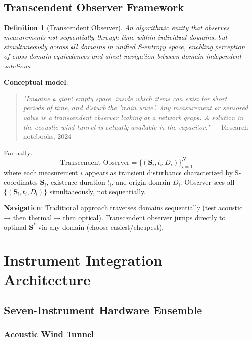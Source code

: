 \documentclass[12pt,a4paper]{article}
\newtheorem{definition}{Definition}
\begin{document}
\subsection{Transcendent Observer Framework}

\begin{definition}[Transcendent Observer]
An algorithmic entity that observes measurements not sequentially through time within individual domains, but simultaneously across all domains in unified S-entropy space, enabling perception of cross-domain equivalences and direct navigation between domain-independent solutions \cite{sachikonye2024transplanckian}.
\end{definition}

\textbf{Conceptual model}:
\begin{quote}
\textit{"Imagine a giant empty space, inside which items can exist for short periods of time, and disturb the 'main wave'. Any measurement or sensored value is a transcendent observer looking at a network graph. A solution in the acoustic wind tunnel is actually available in the capacitor."} — Research notebooks, 2024
\end{quote}

Formally:
\begin{equation}
\text{Transcendent Observer} = \{(\mathbf{S}_i, t_i, D_i)\}_{i=1}^{N}
\end{equation}
where each measurement $i$ appears as transient disturbance characterized by S-coordinates $\mathbf{S}_i$, existence duration $t_i$, and origin domain $D_i$. Observer sees all $\{(\mathbf{S}_i, t_i, D_i)\}$ simultaneously, not sequentially.

\textbf{Navigation}: Traditional approach traverses domains sequentially (test acoustic → then thermal → then optical). Transcendent observer jumps directly to optimal $\mathbf{S}^*$ via any domain (choose easiest/cheapest).

\section{Instrument Integration Architecture}

\subsection{Seven-Instrument Hardware Ensemble}

\subsubsection{Acoustic Wind Tunnel \cite{sachikonye2024acoustic_wind_tunnel}}
\end{document}
